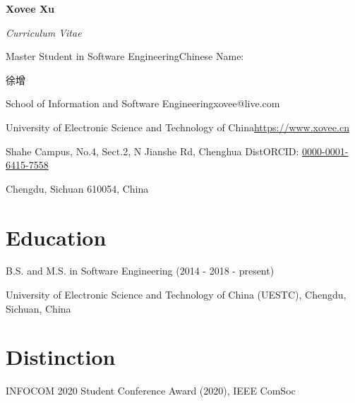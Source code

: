 \documentclass{article}
\begin{document}
\begin{center}
    \Huge{
    \textbf{Xovee Xu}}
\end{center}

\begin{center}
    \Large
    \textit{Curriculum Vitae}
\end{center}


\noindent Master Student in Software Engineering\hfill Chinese Name: \begin{CJK*}{UTF8}{gkai}徐增\end{CJK*}

\noindent School of Information and Software Engineering\hfill xovee@live.com

\noindent University of Electronic Science and Technology of China\hfill \url{https://www.xovee.cn}

\noindent Shahe Campus, No.4, Sect.2, N Jianshe Rd, Chenghua Dist\hfill ORCID: \href{https://orcid.org/0000-0001-6415-7558}{0000-0001-6415-7558}

\noindent Chengdu, Sichuan 610054, China

\setlength{\parskip}{3pt}


\vspace{-8pt}
\section*{Education}
\vspace{-4pt}
\indent 


B.S. and M.S. in Software Engineering (2014 - 2018 - present)

University of Electronic Science and Technology of China (UESTC), Chengdu, Sichuan, China


\vspace{-8pt}
\section*{Distinction}
\vspace{-4pt}
\indent

INFOCOM 2020 Student Conference Award (2020), IEEE ComSoc
\end{document}
